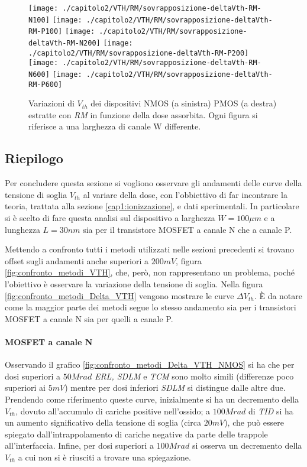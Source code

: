 \begin{figure}[H]
  \centering
  \texttt{[image: ./capitolo2/VTH/RM/sovrapposizione-deltaVth-RM-N100]}
  \texttt{[image: ./capitolo2/VTH/RM/sovrapposizione-deltaVth-RM-P100]}
  \texttt{[image: ./capitolo2/VTH/RM/sovrapposizione-deltaVth-RM-N200]}
  \texttt{[image: ./capitolo2/VTH/RM/sovrapposizione-deltaVth-RM-P200]}
  \texttt{[image: ./capitolo2/VTH/RM/sovrapposizione-deltaVth-RM-N600]}
  \texttt{[image: ./capitolo2/VTH/RM/sovrapposizione-deltaVth-RM-P600]}
  \caption[Dati $\Delta V_{th}$ estratti con RM]{Variazioni di $V_{th}$ dei dispositivi NMOS (a sinistra) PMOS (a destra) estratte con \emph{RM} in funzione della dose assorbita. Ogni figura si riferisce a una larghezza di canale W differente.}

\end{figure}


\subsection{Riepilogo}
Per concludere questa sezione si vogliono osservare gli andamenti delle curve della tensione di soglia $V_{th}$ al variare della dose, con l'obbiettivo di far incontrare la teoria, trattata alla sezione \ref{cap1:ionizzazione}, e dati sperimentali.
In particolare si è scelto di fare questa analisi sul dispositivo a larghezza $W = 100 \mu m$ e a lunghezza $L = 30 nm$ sia per il transistore MOSFET a canale N che a canale P. 

Mettendo a confronto tutti i metodi utilizzati nelle sezioni precedenti si trovano offset sugli andamenti anche superiori a $200mV$, figura \ref{fig:confronto_metodi_VTH}, che, però, non rappresentano un problema, poché l'obiettivo è osservare la variazione della tensione di soglia. Nella figura \ref{fig:confronto_metodi_Delta_VTH} vengono mostrare le curve $\Delta V_{th}$. È da notare come la maggior parte dei metodi segue lo stesso andamento sia per i transistori MOSFET a canale N sia per quelli a canale P.

\paragraph*{MOSFET a canale N} Osservando il grafico \ref{fig:confronto_metodi_Delta_VTH_NMOS} si ha che per dosi superiori a $50 Mrad$ \textit{ERL, SDLM} e \textit{TCM} sono molto simili (differenze poco superiori ai $5mV$) mentre per dosi inferiori \textit{SDLM} si distingue dalle altre due. Prendendo come riferimento queste curve, inizialmente si ha un decremento della $V_{th}$, dovuto all'accumulo di cariche positive nell'ossido; a $100Mrad$ di \emph{TID} si ha un aumento significativo della tensione di soglia (circa $20mV$), che può essere spiegato dall'intrappolamento di cariche negative da parte delle trappole all'interfaccia. Infine, per dosi superiori a $100Mrad$ si osserva un decremento della $V_{th}$ a cui non si è riusciti a trovare una spiegazione. 

